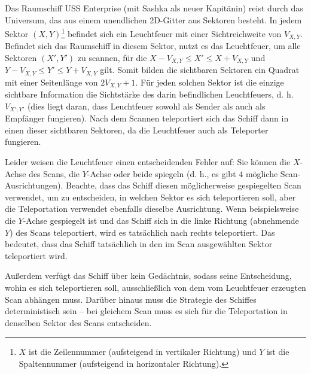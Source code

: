 \documentclass[12pt]{article}
\begin{document}
\renewcommand{\headerLang}{German}
\renewcommand{\problemName}{AB13. Vision}

\renewcommand{\headerLeft}{IATI Day 1, Senior group}
\renewcommand{\headerRightFirst}{XVII INTERNATIONAL ADVANCED TOURNAMENT IN INFORMATICS}
\renewcommand{\headerRightSecond}{ONLINE 2026}

\renewcommand{\tl}{$5$ s}
\renewcommand{\ml}{$1024$ MB}
\problem{Task \problemName}


Das Raumschiff USS Enterprise (mit Sashka als neuer Kapitänin) reist durch das Universum, das aus einem unendlichen 2D-Gitter aus Sektoren besteht. In jedem Sektor $(X, Y)$\footnote{$X$ ist die Zeilennummer (aufsteigend in vertikaler Richtung) und $Y$ ist die Spaltennummer (aufsteigend in horizontaler Richtung).} befindet sich ein Leuchtfeuer mit einer Sichtreichweite von $V_{X, Y}$. Befindet sich das Raumschiff in diesem Sektor, nutzt es das Leuchtfeuer, um alle Sektoren $(X', Y')$ zu scannen, für die $X - V_{X, Y} \leq X' \leq X + V_{X, Y}$ und $Y - V_{X, Y} \leq Y' \leq Y + V_{X, Y}$ gilt. Somit bilden die sichtbaren Sektoren ein Quadrat mit einer Seitenlänge von $2V_{X, Y} + 1$. Für jeden solchen Sektor ist die einzige sichtbare Information die Sichtstärke des darin befindlichen Leuchtfeuers, d. h. $V_{X', Y'}$ (dies liegt daran, dass Leuchtfeuer sowohl als Sender als auch als Empfänger fungieren). Nach dem Scannen teleportiert sich das Schiff dann in einen dieser sichtbaren Sektoren, da die Leuchtfeuer auch als Teleporter fungieren.

Leider weisen die Leuchtfeuer einen entscheidenden Fehler auf: Sie können die $X$-Achse des Scans, die $Y$-Achse oder beide spiegeln (d. h., es gibt $4$ mögliche Scan-Ausrichtungen). Beachte, dass das Schiff diesen möglicherweise gespiegelten Scan verwendet, um zu entscheiden, in welchen Sektor es sich teleportieren soll, aber die Teleportation verwendet ebenfalls dieselbe Ausrichtung. Wenn beispielsweise die $Y$-Achse gespiegelt ist und das Schiff sich in die linke Richtung (abnehmende $Y$) des Scans teleportiert, wird es tatsächlich nach rechts teleportiert. Das bedeutet, dass das Schiff tatsächlich in den im Scan ausgewählten Sektor teleportiert wird.

Außerdem verfügt das Schiff über kein Gedächtnis, sodass seine Entscheidung, wohin es sich teleportieren soll, ausschließlich von dem vom Leuchtfeuer erzeugten Scan abhängen muss. Darüber hinaus muss die Strategie des Schiffes deterministisch sein – bei gleichem Scan muss es sich für die Teleportation in denselben Sektor des Scans entscheiden.
\end{document}
